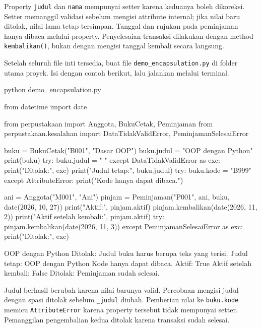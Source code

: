Property \texttt{judul} dan \texttt{nama} mempunyai setter karena keduanya boleh dikoreksi. Setter memanggil validasi sebelum mengisi attribute internal; jika nilai baru ditolak, nilai lama tetap tersimpan. Tanggal dan rujukan pada peminjaman hanya dibaca melalui property. Penyelesaian transaksi dilakukan dengan method \texttt{kembalikan()}, bukan dengan mengisi tanggal kembali secara langsung.

Setelah seluruh file inti tersedia, buat file \texttt{demo\_encapsulation.py} di folder utama proyek. Isi dengan contoh berikut, lalu jalankan melalui terminal.

\begin{keluaran}
python demo_encapsulation.py
\end{keluaran}

\begin{kode}
from datetime import date

from perpustakaan import Anggota, BukuCetak, Peminjaman
from perpustakaan.kesalahan import DataTidakValidError, PeminjamanSelesaiError


buku = BukuCetak("B001", "Dasar OOP")
buku.judul = "OOP dengan Python"
print(buku)
try:
    buku.judul = "   "
except DataTidakValidError as exc:
    print("Ditolak:", exc)
print("Judul tetap:", buku.judul)
try:
    buku.kode = "B999"
except AttributeError:
    print("Kode hanya dapat dibaca.")

ani = Anggota("M001", "Ani")
pinjam = Peminjaman("P001", ani, buku, date(2026, 10, 27))
print("Aktif:", pinjam.aktif)
pinjam.kembalikan(date(2026, 11, 2))
print("Aktif setelah kembali:", pinjam.aktif)
try:
    pinjam.kembalikan(date(2026, 11, 3))
except PeminjamanSelesaiError as exc:
    print("Ditolak:", exc)
\end{kode}

\begin{keluaran}
[B001] OOP dengan Python
Ditolak: Judul buku harus berupa teks yang terisi.
Judul tetap: OOP dengan Python
Kode hanya dapat dibaca.
Aktif: True
Aktif setelah kembali: False
Ditolak: Peminjaman sudah selesai.
\end{keluaran}

Judul berhasil berubah karena nilai barunya valid. Percobaan mengisi judul dengan spasi ditolak sebelum \texttt{\_judul} diubah. Pemberian nilai ke \texttt{buku.kode} memicu \texttt{AttributeError} karena property tersebut tidak mempunyai setter. Pemanggilan pengembalian kedua ditolak karena transaksi sudah selesai.

